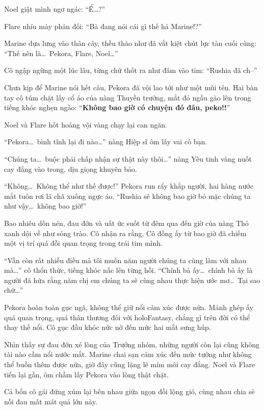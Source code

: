 \documentclass[../main.tex]{subfiles}
\begin{document}
Noel giật mình ngơ ngác: ``Ể\dots?''

Flare nhíu mày phản đối: ``Bà đang nói cái gì thế hả Marine!?''

Marine dựa lưng vào thân cây, thều thào như đã vắt kiệt chút lực tàn cuối cùng: ``Thế nên là\dots\ Pekora, Flare, Noel\dots''

Cô ngập ngừng một lúc lâu, từng chữ thốt ra như đâm vào tim: ``Rushia đã ch--''

Chưa kịp để Marine nói hết câu, Pekora đã vội lao tới như một mũi tên. Hai bàn tay cô túm chặt lấy cổ áo của nàng Thuyền trưởng, mắt đỏ ngầu gào lên trong tiếng khóc nghẹn ngào: ``\textbf{Không bao giờ có chuyện đó đâu, peko!!}''

Noel và Flare hốt hoảng vội vàng chạy lại can ngăn.

``Pekora\dots\ bình tĩnh lại đi nào\dots'' nàng Hiệp sĩ ôm lấy vai cô bạn.

``Chúng ta\dots\ buộc phải chấp nhận sự thật này thôi\dots'' nàng Yêu tinh vàng nuốt cay đắng vào trong, dịu giọng khuyên bảo.

``Không\dots\ Không thể như thế được!'' Pekora run rẩy khắp người, hai hàng nước mắt tuôn rơi lã chã xuống ngực áo. ``Rushia sẽ không bao giờ bỏ mặc chúng ta như vậy\dots\ không bao giờ!''

Bao nhiêu dồn nén, đau đớn và uất ức suốt từ đêm qua đến giờ của nàng Thỏ xanh dội về như sóng trào. Cô nhận ra rằng, Cô đồng ấy từ bao giờ đã chiếm một vị trí quá đỗi quan trọng trong trái tim mình.

``Vẫn còn rất nhiều điều mà tôi muốn năm người chúng ta cùng làm với nhau mà\dots'' cô thổn thức, tiếng khóc nấc lên từng hồi. ``Chính bà ấy\dots\ chính bà ấy là người đã hứa rằng năm chị em chúng ta sẽ cùng nhau thực hiện ước mơ\dots\ Tại sao chứ\dots''

Pekora hoàn toàn gục ngã, không thể giữ nổi cảm xúc được nữa. Mảnh ghép ấy quá quan trọng, quá thân thương đối với holoFantasy, chẳng gì trên đời có thể thay thế nổi. Cô gục đầu khóc nức nở đến mức hai mắt sưng húp.

Nhìn thấy sự đau đớn xé lòng của Trưởng nhóm, những người còn lại cũng không tài nào cầm nổi nước mắt. Marine chai sạn cảm xúc đến mức tưởng như không thể buồn thêm được nữa, giờ đây cũng lặng lẽ mím môi cay đắng. Noel và Flare tiến lại gần, ôm chầm lấy Pekora vào lòng thật chặt.

Cả bốn cô gái đứng xúm lại bên nhau giữa ngọn đồi lộng gió, cùng nhau chia sẻ nỗi đau mất mát quá lớn này.
\end{document}
